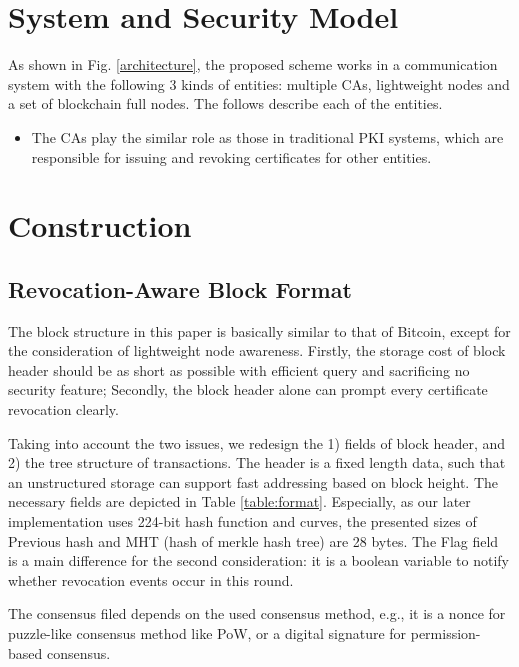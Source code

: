 \documentclass[conference]{IEEEtran}
\begin{document}
\section{System and Security Model} \label{sec:model}
As shown in Fig. \ref{architecture}, the proposed scheme works in a communication system with the following 3 kinds of entities: multiple CAs, lightweight nodes and a set of blockchain full nodes. The follows describe each of the entities. 

\begin{itemize}
	\item The CAs play the similar role as those in traditional PKI systems, which are responsible for issuing and revoking certificates for other entities. 
\end{itemize}


\section{Construction}\label{sec:construction}
\subsection{Revocation-Aware Block Format}
\label{sec:format}
The block structure in this paper is basically similar to that of Bitcoin, except for the consideration of lightweight node awareness. Firstly, the storage cost of block header should be as short as possible with efficient query and sacrificing no security feature; Secondly, the block header alone can prompt every certificate revocation clearly. 

Taking into account the two issues, we redesign the 1) fields of block header, and 2) the tree structure of transactions. The header is a fixed length data, such that an unstructured storage can support fast addressing based on block height. The necessary fields are depicted in Table \ref{table:format}. Especially, as our later implementation uses 224-bit hash function and curves, the presented sizes of Previous hash and MHT (hash of merkle hash tree) are 28 bytes. The Flag field is a main difference for the second consideration: it is a boolean variable to notify whether revocation events occur in this round.

The consensus filed depends on the used consensus method, e.g., it is a nonce for puzzle-like consensus method like PoW, or a digital signature for permission-based consensus.
\end{document}
